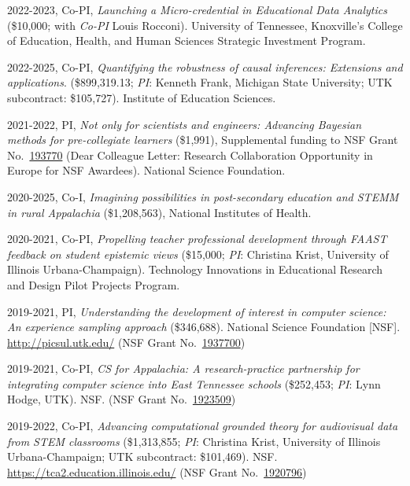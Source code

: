 \documentclass[
  14,
]{article}
\begin{document}
2022-2023, Co-PI, \emph{Launching a Micro-credential in Educational Data
Analytics} (\$10,000; with \emph{Co-PI} Louis Rocconi). University of
Tennessee, Knoxville's College of Education, Health, and Human Sciences
Strategic Investment Program.

2022-2025, Co-PI, \emph{Quantifying the robustness of causal inferences:
Extensions and applications}. (\$899,319.13; \emph{PI}: Kenneth Frank,
Michigan State University; UTK subcontract: \$105,727). Institute of
Education Sciences.

2021-2022, PI, \emph{Not only for scientists and engineers: Advancing
Bayesian methods for pre-collegiate learners} (\$1,991), Supplemental
funding to NSF Grant
No.~\href{https://www.nsf.gov/awardsearch/showAward?AWD_ID=1937700\&HistoricalAwards=false}{193770}
(Dear Colleague Letter: Research Collaboration Opportunity in Europe for
NSF Awardees). National Science Foundation.

2020-2025, Co-I, \emph{Imagining possibilities in post-secondary
education and STEMM in rural Appalachia} (\$1,208,563), National
Institutes of Health.

2020-2021, Co-PI, \emph{Propelling teacher professional development
through FAAST feedback on student epistemic views} (\$15,000; \emph{PI}:
Christina Krist, University of Illinois Urbana-Champaign). Technology
Innovations in Educational Research and Design Pilot Projects Program.

2019-2021, PI, \emph{Understanding the development of interest in
computer science: An experience sampling approach} (\$346,688). National
Science Foundation {[}NSF{]}. \url{http://picsul.utk.edu/} (NSF Grant
No.~\href{https://www.nsf.gov/awardsearch/showAward?AWD_ID=1937700\&HistoricalAwards=false}{1937700})

2019-2021, Co-PI, \emph{CS for Appalachia: A research-practice
partnership for integrating computer science into East Tennessee
schools} (\$252,453; \emph{PI}: Lynn Hodge, UTK). NSF. (NSF Grant
No.~\href{https://www.nsf.gov/awardsearch/showAward?AWD_ID=1923509\&HistoricalAwards=false}{1923509})

2019-2022, Co-PI, \emph{Advancing computational grounded theory for
audiovisual data from STEM classrooms} (\$1,313,855; \emph{PI}:
Christina Krist, University of Illinois Urbana-Champaign; UTK
subcontract: \$101,469). NSF. \url{https://tca2.education.illinois.edu/}
(NSF Grant
No.~\href{https://www.nsf.gov/awardsearch/showAward?AWD_ID=1920796\&HistoricalAwards=false}{1920796})
\end{document}
